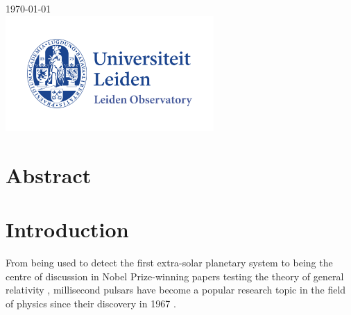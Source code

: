 \begin{titlepage}


{\large \today}\\[2cm] %


\includegraphics[width=300px, keepaspectratio]{logo-univ-leidenobservatory-transparent.png}\\[1cm] %
 

\vfill %
\end{titlepage}

\section*{Abstract}


\newpage
\tableofcontents



\newpage
{}
\section{Introduction}\label{Introduction}
\setcounter{figure}{0} 
From being used to detect the first extra-solar planetary system \citep{Planet} to being the centre of discussion in Nobel Prize-winning papers testing the theory of general relativity \citep{NobelPrize}, millisecond pulsars have become a popular research topic in the field of physics since their discovery in 1967 \citep{Bell}.


